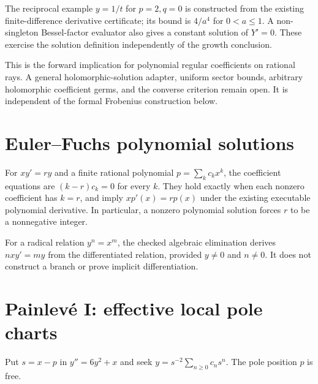 The reciprocal example $y=1/t$ for $p=2,q=0$ is constructed from the
existing finite-difference derivative certificate; its bound is $4/a^4$
for $0<a\le1$. A non-singleton Bessel-factor evaluator also gives a
constant solution of $Y'=0$. These exercise the solution definition
independently of the growth conclusion.
\leanok

This is the forward implication for polynomial regular coefficients on
rational rays. A general holomorphic-solution adapter, uniform sector bounds,
arbitrary holomorphic coefficient germs, and the converse criterion remain
open. It is independent of the formal Frobenius construction below.

\section{Euler--Fuchs polynomial solutions}

\begin{theorem}
\label{thm:fuchs-polynomial-classification}
For $xy'=r y$ and a finite rational polynomial $p=\sum_k c_kx^k$,
the coefficient equations are $(k-r)c_k=0$ for every $k$.
They hold exactly when each nonzero coefficient has $k=r$, and imply
$x p'(x)=r p(x)$ under the existing executable polynomial derivative.
In particular, a nonzero polynomial solution forces $r$ to be a
nonnegative integer.
\leanok
\end{theorem}

For a radical relation $y^n=x^m$, the checked algebraic elimination derives
$nxy'=my$ from the differentiated relation, provided $y\ne0$ and $n\ne0$.
It does not construct a branch or prove implicit differentiation.
\leanok

\section{Painlev\'e I: effective local pole charts}

Put $s=x-p$ in $y''=6y^2+x$ and seek
$y=s^{-2}\sum_{n\ge0}c_ns^n$. The pole position $p$ is free.

